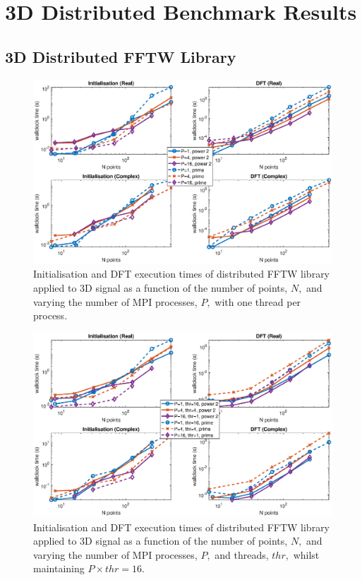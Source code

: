 \documentclass[a4paper]{article}
\begin{document}
\section{3D Distributed Benchmark Results}\label{Sec:3DDistr}

\subsection{3D Distributed FFTW Library}\label{Sec:3DDistFFTW}

\begin{figure}[htb]
    \centering
    \includegraphics[width=\linewidth]{../results/fftw_3d_mpi.eps}
  \caption{Initialisation and DFT execution times of distributed FFTW library applied to 3D signal as a function of the
    number of points, $N,$ and varying the number of MPI processes, $P,$ with one thread per process.}
  \label{3DDistFFTW}
\end{figure}

\begin{figure}[htb]
    \centering
    \includegraphics[width=\linewidth]{../results/fftw_3d_mpi_thr.eps}
  \caption{Initialisation and DFT execution times of distributed FFTW library applied to 3D signal as a function of the
    number of points, $N,$ and varying the number of MPI processes, $P,$ and threads, $thr,$ whilst maintaining $P\times thr=16.$}
  \label{3DDistFFTW16}
\end{figure}
\end{document}
